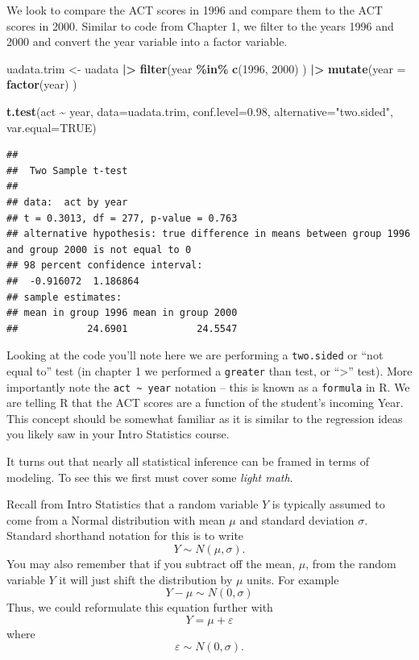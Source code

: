 \documentclass[
]{book}
\newenvironment{Shaded}{\begin{snugshade}}{\end{snugshade}}
\newcommand{\AttributeTok}[1]{\textcolor[rgb]{0.13,0.29,0.53}{#1}}
\newcommand{\ConstantTok}[1]{\textcolor[rgb]{0.56,0.35,0.01}{#1}}
\newcommand{\DecValTok}[1]{\textcolor[rgb]{0.00,0.00,0.81}{#1}}
\newcommand{\FloatTok}[1]{\textcolor[rgb]{0.00,0.00,0.81}{#1}}
\newcommand{\FunctionTok}[1]{\textcolor[rgb]{0.13,0.29,0.53}{\textbf{#1}}}
\newcommand{\NormalTok}[1]{#1}
\newcommand{\OtherTok}[1]{\textcolor[rgb]{0.56,0.35,0.01}{#1}}
\newcommand{\SpecialCharTok}[1]{\textcolor[rgb]{0.81,0.36,0.00}{\textbf{#1}}}
\newcommand{\StringTok}[1]{\textcolor[rgb]{0.31,0.60,0.02}{#1}}
\begin{document}
We look to compare the ACT scores in 1996 and compare them to the ACT scores in 2000.
Similar to code from Chapter 1, we filter to the years 1996 and 2000 and convert the year variable into a factor variable.

\begin{Shaded}
\begin{Highlighting}[]
\NormalTok{uadata.trim }\OtherTok{\textless{}{-}}\NormalTok{ uadata }\SpecialCharTok{|\textgreater{}}
  \FunctionTok{filter}\NormalTok{(year }\SpecialCharTok{\%in\%} \FunctionTok{c}\NormalTok{(}\DecValTok{1996}\NormalTok{, }\DecValTok{2000}\NormalTok{) ) }\SpecialCharTok{|\textgreater{}}
  \FunctionTok{mutate}\NormalTok{(}\AttributeTok{year =} \FunctionTok{factor}\NormalTok{(year) ) }

\FunctionTok{t.test}\NormalTok{(act }\SpecialCharTok{\textasciitilde{}}\NormalTok{ year, }\AttributeTok{data=}\NormalTok{uadata.trim, }\AttributeTok{conf.level=}\FloatTok{0.98}\NormalTok{, }
       \AttributeTok{alternative=}\StringTok{"two.sided"}\NormalTok{, }\AttributeTok{var.equal=}\ConstantTok{TRUE}\NormalTok{)}
\end{Highlighting}
\end{Shaded}

\begin{verbatim}
## 
##  Two Sample t-test
## 
## data:  act by year
## t = 0.3013, df = 277, p-value = 0.763
## alternative hypothesis: true difference in means between group 1996 and group 2000 is not equal to 0
## 98 percent confidence interval:
##  -0.916072  1.186864
## sample estimates:
## mean in group 1996 mean in group 2000 
##            24.6901            24.5547
\end{verbatim}

Looking at the code you'll note here we are performing a \texttt{two.sided} or ``not equal to'' test (in chapter 1 we performed a \texttt{greater} than test, or ``\textgreater{}'' test).
More importantly note the \texttt{act\ \textasciitilde{}\ year} notation -- this is known as a \texttt{formula} in R.
We are telling R that the ACT scores are a function of the student's incoming Year.
This concept should be somewhat familiar as it is similar to the regression ideas you likely saw in your Intro Statistics course.

It turns out that nearly all statistical inference can be framed in terms of modeling.
To see this we first must cover some \emph{light math}.

Recall from Intro Statistics that a random variable \(Y\) is typically assumed to come from a Normal distribution with mean \(\mu\) and standard deviation \(\sigma\).
Standard shorthand notation for this is to write
\[Y \sim N(\mu, \sigma).\]
You may also remember that if you subtract off the mean, \(\mu\), from the random variable \(Y\) it will just shift the distribution by \(\mu\) units.
For example
\[ Y - \mu \sim N(0, \sigma)\]
Thus, we could reformulate this equation further with
\begin{equation}
Y = \mu + \varepsilon 
\label{eq:baseModel}
\end{equation}
where
\[\varepsilon \sim N(0, \sigma).\]
\end{document}
